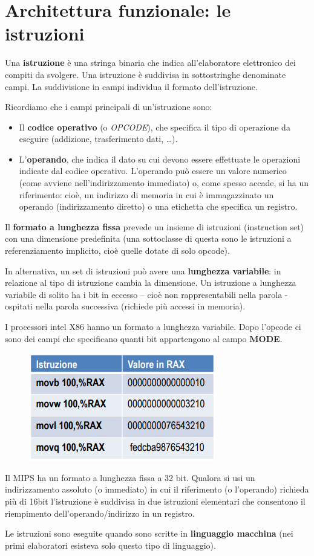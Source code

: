 \documentclass[12pt]{article}
\begin{document}
\section{Architettura funzionale: le istruzioni}
Una \textbf{istruzione} è una stringa binaria che indica all’elaboratore elettronico dei compiti da svolgere.
Una istruzione è suddivisa in sottostringhe denominate campi. La suddivisione in campi individua il formato dell’istruzione.\par\medskip\noindent
Ricordiamo che i campi principali di un'istruzione sono: 
\begin{itemize}
    \item Il \textbf{codice operativo} (o \textit{OPCODE}), che specifica il tipo di operazione da eseguire (addizione, trasferimento dati, …).
    \item L’\textbf{operando}, che indica il dato su cui devono essere effettuate le operazioni indicate dal codice operativo. L’operando può essere un valore numerico (come avviene nell’indirizzamento immediato) o, come spesso accade, si ha un riferimento: cioè, un indirizzo di memoria in cui è immagazzinato un operando (indirizzamento diretto) o una etichetta che specifica un registro.
\end{itemize}
\par\medskip\noindent
Il \textbf{formato a lunghezza fissa} prevede un insieme di istruzioni (instruction set) con una dimensione predefinita (una sottoclasse di questa sono le istruzioni a referenziamento implicito, cioè quelle dotate di solo opcode). \par\medskip\noindent
In alternativa, un set di istruzioni può avere una \textbf{lunghezza variabile}: in relazione al tipo di istruzione cambia la dimensione. Un istruzione a lunghezza variabile di solito ha i bit in eccesso – cioè non rappresentabili nella parola - ospitati nella parola successiva (richiede più accessi in memoria).\par\medskip\noindent
I processori intel X86 hanno un formato a lunghezza variabile. Dopo l’opcode ci sono dei campi che specificano quanti bit appartengono al campo \textbf{MODE}.
\begin{figure}[h]
    \centering
    \includegraphics[width=0.5\linewidth]{image.png}
    \label{fig:enter-label}
\end{figure}
\par\medskip\noindent
Il MIPS ha un formato a lunghezza fissa a 32 bit.
Qualora si usi un indirizzamento assoluto (o immediato) in cui il riferimento (o l’operando) richieda più di 16bit l’istruzione è suddivisa in due istruzioni elementari che consentono il riempimento dell’operando/indirizzo in un registro.
\par\medskip\noindent
Le istruzioni sono eseguite quando sono scritte in \textbf{linguaggio macchina} (nei primi elaboratori esisteva solo questo tipo di linguaggio). 
\end{document}
